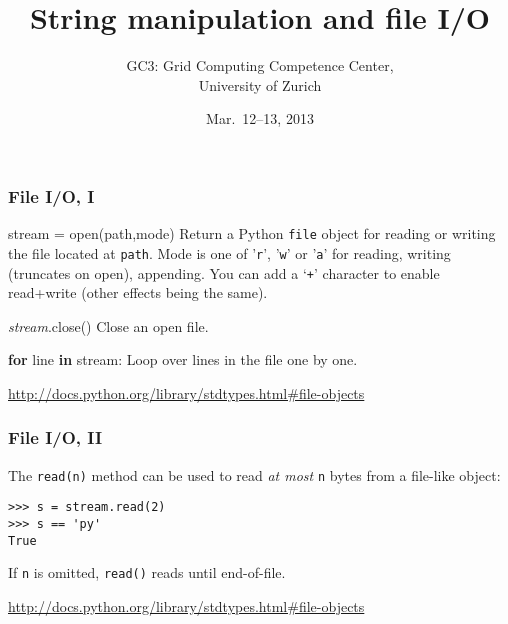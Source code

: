 \documentclass[english,serif,mathserif,xcolor=pdftex,dvipsnames,table]{beamer}
\title[Part 4]{%
  String manipulation and file I/O
}
\author[GC3]{%
  GC3: Grid Computing Competence Center, \\
  University of Zurich
}
\date{Mar.~12--13, 2013}
\begin{document}
\maketitle

\begin{frame}[fragile]
  \frametitle{File I/O, I}

  \begin{describe}{\ttfamily stream = open(path,mode)}
    Return a Python \texttt{file} object for reading or writing the
    file located at \texttt{path}.  Mode is one of '\texttt{r}',
    '\texttt{w}' or '\texttt{a}' for reading, writing (truncates on open), appending.
    You can add a `\texttt{+}' character to enable read+write (other
    effects being the same).
  \end{describe}

  \begin{describe}{\ttfamily \emph{stream}.close()}
    Close an open file.
  \end{describe}

  \begin{describe}{\ttfamily \textbf{for} line \textbf{in} stream:}
    Loop over lines in the file one by one.
  \end{describe}

  \begin{references}
    \url{http://docs.python.org/library/stdtypes.html#file-objects}
  \end{references}
\end{frame}


\begin{frame}[fragile]
  \frametitle{File I/O, II}

  The \lstinline|read(n)| method can be used to read \emph{at most}
  \lstinline|n| bytes from a file-like object:
\begin{lstlisting}
>>> s = stream.read(2)
>>> s == 'py'
True
\end{lstlisting}
  If \lstinline|n| is omitted, \texttt{read()} reads until end-of-file.

  \begin{references}
    \url{http://docs.python.org/library/stdtypes.html#file-objects}
  \end{references}
\end{frame}
\end{document}
